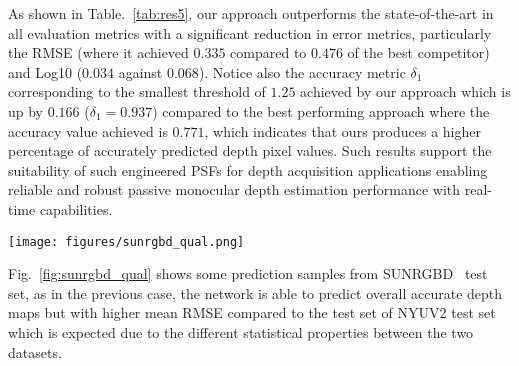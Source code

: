 \documentclass[preprint,5p,twocolumn]{elsarticle}
\begin{document}
\begin{table}[h!]
\begin{center}
\end{center}
\centering
\caption{Quantitative comparison with the state-of-the-art methods for monocular depth estimation task on SUNRGBD~\cite{song2015sun} test set.}
\label{tab:res5}
\end{table}

As shown in Table.~\ref{tab:res5}, our approach outperforms the state-of-the-art in all evaluation metrics with a significant reduction in error metrics, particularly the RMSE (where it achieved $0.335$ compared to $0.476$ of the best competitor) and Log10 ($0.034$ against $0.068$). Notice also the accuracy metric $\delta_{1}$ corresponding to the smallest threshold of $1.25$ achieved by our approach which is up by $0.166$ ($\delta_{1} = 0.937$) compared to the best performing approach where the accuracy value achieved is $0.771$, which indicates that ours produces a higher percentage of accurately predicted depth pixel values.
Such results support the suitability of such engineered PSFs for depth acquisition applications enabling reliable and robust passive monocular depth estimation performance with real-time capabilities. 

\begin{figure*}[h!]
\centering
\texttt{[image: figures/sunrgbd\_qual.png]}
\caption{Qualitative results from our proposed method on the test set SUNRGBD~\cite{song2015sun}}
\label{fig:sunrgbd_qual}
\end{figure*}
Fig.~\ref{fig:sunrgbd_qual} shows some prediction samples from SUNRGBD~\cite{song2015sun} test set, as in the previous case, the network is able to predict overall accurate depth maps but with higher mean RMSE compared to the test set of NYUV2 test set~\cite{eigen2015predicting} which is expected due 
to the different statistical properties between the two datasets.
\end{document}
